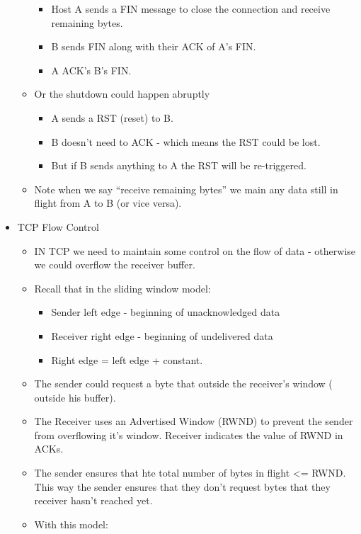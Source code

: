 \begin{itemize}
\begin{itemize}
    \begin{itemize}
    \tightlist
    \item
      Host A sends a FIN message to close the connection and receive
      remaining bytes.
    \item
      B sends FIN along with their ACK of A's FIN.
    \item
      A ACK's B's FIN.
    \end{itemize}
  \item
    Or the shutdown could happen abruptly

    \begin{itemize}
    \tightlist
    \item
      A sends a RST (reset) to B.
    \item
      B doesn't need to ACK - which means the RST could be lost.
    \item
      But if B sends anything to A the RST will be re-triggered.
    \end{itemize}
  \item
    Note when we say ``receive remaining bytes'' we main any data still
    in flight from A to B (or vice versa).
  \end{itemize}
\item
  TCP Flow Control

  \begin{itemize}
  \tightlist
  \item
    IN TCP we need to maintain some control on the flow of data -
    otherwise we could overflow the receiver buffer.
  \item
    Recall that in the sliding window model:

    \begin{itemize}
    \tightlist
    \item
      Sender left edge - beginning of unacknowledged data
    \item
      Receiver right edge - beginning of undelivered data
    \item
      Right edge = left edge + constant.
    \end{itemize}
  \item
    The sender could request a byte that outside the receiver's window (
    outside his buffer).
  \item
    The Receiver uses an Advertised Window (RWND) to prevent the sender
    from overflowing it's window. Receiver indicates the value of RWND
    in ACKs.
  \item
    The sender ensures that hte total number of bytes in flight
    \textless{}= RWND. This way the sender ensures that they don't
    request bytes that they receiver hasn't reached yet.
  \item
    With this model:


\end{itemize}
\end{itemize}
